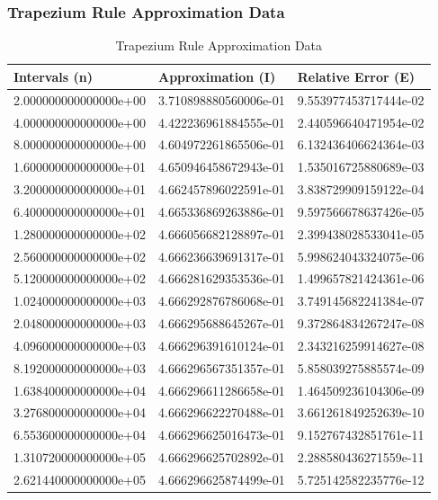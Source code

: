 \documentclass[pdf,color]{UoBnote}
\begin{document}
		\subsubsection{Trapezium Rule Approximation Data}
			\begin{table}[H]
			\centering
			\caption{Trapezium Rule Approximation Data}
    \begin{tabular}{|l|l|l|}
        \hline
		Intervals (n) & Approximation (I) & Relative Error (E)\\
		\hline
        2.000000000000000e+00 & 3.710898880560006e-01 & 9.553977453717444e-02 \\
        4.000000000000000e+00 & 4.422236961884555e-01 & 2.440596640471954e-02 \\ 
        8.000000000000000e+00 & 4.604972261865506e-01 & 6.132436406624364e-03 \\ 
        1.600000000000000e+01 & 4.650946458672943e-01 & 1.535016725880689e-03 \\ 
        3.200000000000000e+01 & 4.662457896022591e-01 & 3.838729909159122e-04 \\ 
        6.400000000000000e+01 & 4.665336869263886e-01 & 9.597566678637426e-05 \\ 
        1.280000000000000e+02 & 4.666056682128897e-01 & 2.399438028533041e-05 \\ 
        2.560000000000000e+02 & 4.666236639691317e-01 & 5.998624043324075e-06 \\ 
        5.120000000000000e+02 & 4.666281629353536e-01 & 1.499657821424361e-06 \\ 
        1.024000000000000e+03 & 4.666292876786068e-01 & 3.749145682241384e-07 \\ 
        2.048000000000000e+03 & 4.666295688645267e-01 & 9.372864834267247e-08 \\ 
        4.096000000000000e+03 & 4.666296391610124e-01 & 2.343216259914627e-08 \\ 
        8.192000000000000e+03 & 4.666296567351357e-01 & 5.858039275885574e-09 \\ 
        1.638400000000000e+04 & 4.666296611286658e-01 & 1.464509236104306e-09 \\ 
        3.276800000000000e+04 & 4.666296622270488e-01 & 3.661261849252639e-10 \\ 
        6.553600000000000e+04 & 4.666296625016473e-01 & 9.152767432851761e-11 \\ 
        1.310720000000000e+05 & 4.666296625702892e-01 & 2.288580436271559e-11 \\ 
        2.621440000000000e+05 & 4.666296625874499e-01 & 5.725142582235776e-12 \\ 

\end{tabular}
\end{table}
\end{document}
